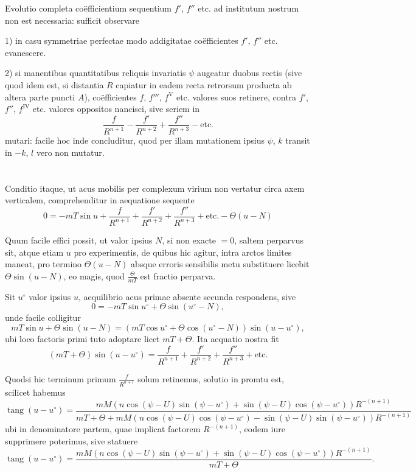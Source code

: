 \documentclass[fontsize=11pt,paper=a4,twoside,openany]{scrbook}
\DeclareMathOperator{\tang}{tang}
\begin{document}
Evolutio completa coëfficientium sequentium $f'$, $f''$ etc. ad institutum nostrum non est necessaria: sufficit observare

1) in casu symmetriae perfectae modo addigitatae coëfficientes $f'$, $f''$ etc. evanescere.

2) si manentibus quantitatibus reliquis invariatis $\psi$ augeatur duobus rectis (sive quod idem est, si distantia $R$ capiatur in eadem recta retrorsum producta ab altera parte puncti $A$), coëfficientes $f$, $f'''$, $f^{\mathrm{V}}$ etc. valores suos retinere, contra $f'$, $f''$, $f^{\mathrm{IV}}$ etc. valores oppositos nancisci, sive seriem in
\[
\frac{f}{R^{n+1}} - \frac{f'}{R^{n+2}} + \frac{f''}{R^{n+3}} - \text{etc.}
\]
mutari: facile hoc inde concluditur, quod per illam mutationem ipsius $\psi$, $k$ transit in $-k$, $l$ vero non mutatur.

\section{}

Conditio itaque, ut acus mobilis per complexum virium non vertatur circa axem verticalem, comprehenditur in aequatione sequente
\[
0 = -mT\sin u + \frac{f}{R^{n+1}} + \frac{f'}{R^{n+2}} + \frac{f''}{R^{n+3}} + \text{etc.} - \Theta(u-N)
\]

Quum facile effici possit, ut valor ipsius $N$, si non exacte $=0$, saltem perparvus sit, atque etiam $u$ pro experimentis, de quibus hic agitur, intra arctos limites maneat, pro termino $\Theta(u-N)$ absque erroris sensibilis metu substituere licebit $\Theta\sin(u-N)$, eo magis, quod $\frac{\Theta}{mT}$ est fractio perparva.

Sit $u^{\circ}$ valor ipsius $u$, aequilibrio acus primae absente secunda respondens, sive
\[
0 = -mT\sin u^{\circ} + \Theta\sin(u^{\circ}-N),
\]
unde facile colligitur
\[
mT\sin u + \Theta\sin(u-N) = (mT\cos u^{\circ} + \Theta\cos(u^{\circ}-N))\sin(u-u^{\circ}),
\]
ubi loco factoris primi tuto adoptare licet $mT+\Theta$. Ita aequatio nostra fit
\[
(mT+\Theta)\sin(u-u^{\circ}) = \frac{f}{R^{n+1}} + \frac{f'}{R^{n+2}} + \frac{f''}{R^{n+3}} + \text{etc.}
\]

Quodsi hic terminum primum $\frac{f}{R^{n+1}}$ solum retinemus, solutio in promtu est, scilicet habemus
\[
\tang(u-u^{\circ}) = \frac{mM(n\cos(\psi-U)\sin(\psi-u^{\circ}) + \sin(\psi-U)\cos(\psi-u^{\circ}))R^{-(n+1)}}{mT+\Theta+mM(n\cos(\psi-U)\cos(\psi-u^{\circ}) - \sin(\psi-U)\sin(\psi-u^{\circ}))R^{-(n+1)}}
\]
ubi in denominatore partem, quae implicat factorem $R^{-(n+1)}$, eodem iure supprimere poterimus, sive statuere
\[
\tang(u-u^{\circ}) = \frac{mM(n\cos(\psi-U)\sin(\psi-u^{\circ}) + \sin(\psi-U)\cos(\psi-u^{\circ}))R^{-(n+1)}}{mT+\Theta}.
\]
\end{document}
